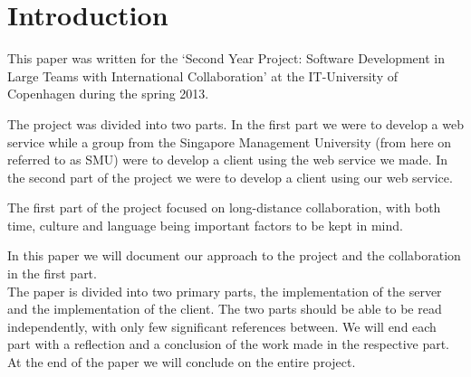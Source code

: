 \section{Introduction}
This paper was written for the `Second Year Project: Software Development in Large Teams with International Collaboration' at the IT-University of Copenhagen during the spring 2013.

The project was divided into two parts. In the first part we were to develop a web service while a group from the Singapore Management University (from here on referred to as SMU) were to develop a client using the web service we made. In the second part of the project we were to develop a client using our web service.

The first part of the project focused on long-distance collaboration, with both time, culture and language being important factors to be kept in mind.

In this paper we will document our approach to the project and the collaboration in the first part.\\
The paper is divided into two primary parts, the implementation of the server and the implementation of the client.
The two parts should be able to be read independently, with only few significant references between. We will end each part with a reflection and a conclusion of the work made in the respective part.
At the end of the paper we will conclude on the entire project.
\newpage